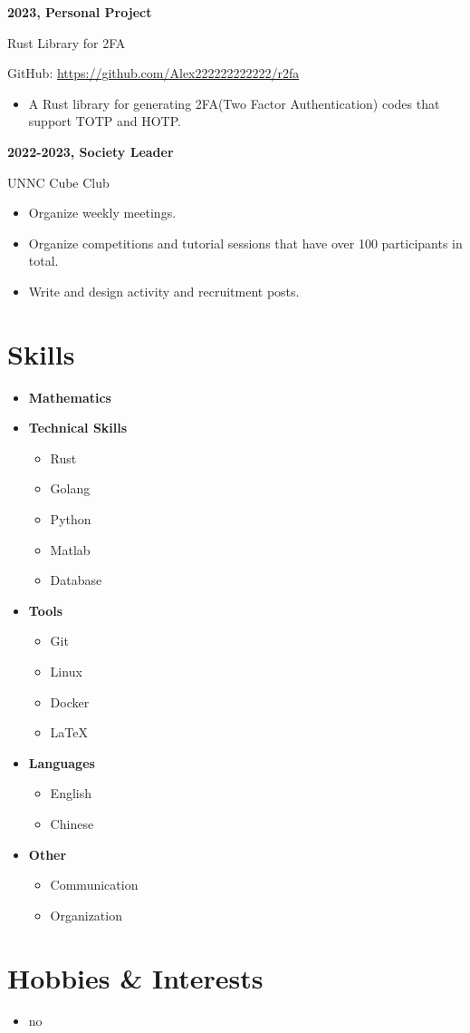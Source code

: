 \documentclass{article}
\begin{document}
    \noindent\textbf{2023, Personal Project}
    
    \noindent Rust Library for 2FA

    \noindent GitHub: \href{https://github.com/Alex222222222222/r2fa}{https://github.com/Alex222222222222/r2fa}
    \begin{itemize}
        \item A Rust library for generating 2FA(Two Factor Authentication) codes that support TOTP and HOTP.
    \end{itemize}

    \noindent\textbf{2022-2023, Society Leader}
    
    \noindent UNNC Cube Club
    \begin{itemize}
            \item Organize weekly meetings.
            \item Organize competitions and tutorial sessions that have over 100 participants in total.
            \item Write and design activity and recruitment posts.
    \end{itemize}

\section*{Skills}
\begin{itemize}[leftmargin=*]
    \item \textbf{Mathematics}
    \item \textbf{Technical Skills}
    \begin{itemize}
        \item Rust
        \item Golang
        \item Python
        \item Matlab
        \item Database
    \end{itemize}
    \item \textbf{Tools}
    \begin{itemize}
        \item Git
        \item Linux
        \item Docker
        \item \LaTeX
    \end{itemize}
    \item \textbf{Languages}
    \begin{itemize}
        \item English
        \item Chinese
    \end{itemize}
    \item \textbf{Other}
    \begin{itemize}
        \item Communication
        \item Organization
    \end{itemize}
\end{itemize}

\section*{Hobbies \& Interests}
\begin{itemize}
    \item no
\end{itemize}
\end{document}
